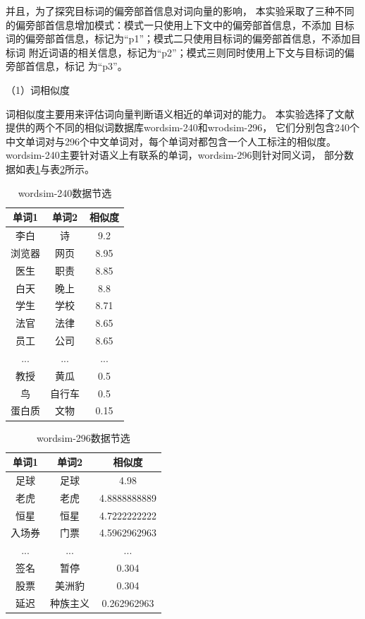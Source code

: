 并且，为了探究目标词的偏旁部首信息对词向量的影响，
本实验采取了三种不同的偏旁部首信息增加模式：模式一只使用上下文中的偏旁部首信息，不添加
目标词的偏旁部首信息，标记为“p1”；模式二只使用目标词的偏旁部首信息，不添加目标词
附近词语的相关信息，标记为“p2”；模式三则同时使用上下文与目标词的偏旁部首信息，标记
为“p3”。

（1）词相似度

词相似度主要用来评估词向量判断语义相近的单词对的能力。
本实验选择了文献\cite{chen2015joint}提供的两个不同的相似词数据库wordsim-240和wrodsim-296，
它们分别包含240个中文单词对与296个中文单词对，每个单词对都包含一个人工标注的相似度。
wordsim-240主要针对语义上有联系的单词，wordsim-296则针对同义词，
部分数据如表\ref{wordsim-240_form}与表\ref{wordsim-296_form}所示。

\begin{table}[h]
    \caption{wordsim-240数据节选}
    \begin{tabular}{|c|c|c|}
        \hline
        单词1 & 单词2 & 相似度 \\
        \hline
        李白 & 诗 & 9.2 \\
        \hline
        浏览器 & 网页 & 8.95 \\
        \hline
        医生 & 职责 & 8.85 \\
        \hline
        白天 & 晚上 & 8.8 \\
        \hline
        学生 & 学校 & 8.71 \\
        \hline
        法官 & 法律 & 8.65 \\
        \hline
        员工 & 公司 & 8.65 \\
        \hline
        ... & ... & ... \\
        \hline
        教授 & 黄瓜 & 0.5 \\
        \hline
        鸟 & 自行车 & 0.5 \\
        \hline
        蛋白质 & 文物 & 0.15 \\
        \hline
    \end{tabular}
    \label{wordsim-240_form}
    \end{table}

\begin{table}[h]
\caption{wordsim-296数据节选}
\begin{tabular}{|c|c|c|}
    \hline
    单词1 & 单词2 & 相似度 \\
    \hline
    足球 & 足球 & 4.98 \\
    \hline
    老虎 & 老虎 & 4.8888888889 \\
    \hline
    恒星 & 恒星 & 4.7222222222 \\
    \hline
    入场券 & 门票 & 4.5962962963 \\
    \hline
    ... & ... & ... \\
    \hline
    签名 & 暂停 & 0.304 \\
    \hline
    股票 & 美洲豹 & 0.304 \\
    \hline
    延迟 & 种族主义 & 0.262962963 \\
    \hline
\end{tabular}
\label{wordsim-296_form}
\end{table}

